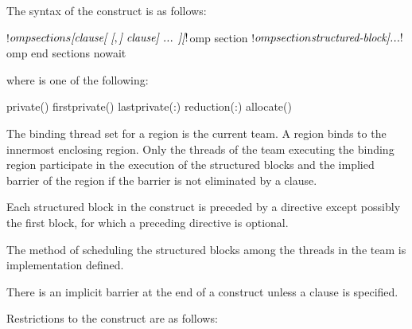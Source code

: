 \begin{fortranspecific}
The syntax of the  construct is as follows:

\begin{ompfPragma}
!$omp sections \plc{[clause[ [},\plc{] clause] ... ]}
   \plc{[}!$omp section\plc{]}
   \plc{[}!$omp section
      \plc{structured-block]}
   \plc{...}
!$omp end sections \plc{[}nowait\plc{]}
\end{ompfPragma}

\begin{samepage}
where  is one of the following:

\begin{indentedcodelist}
private()
firstprivate()
lastprivate(\plc{[ lastprivate-modifier}:\plc{] list})
reduction(:)
allocate(\plc{[allocator: ]})
\end{indentedcodelist}
\end{samepage}
\end{fortranspecific}

\binding
The binding thread set for a  region is the current team. A 
region binds to the innermost enclosing  region. Only the threads of the team
executing the binding  region participate in the execution of the structured
blocks and the implied barrier of the  region if the barrier is not eliminated
by a  clause.

\descr
Each structured block in the  construct is preceded by a  directive
except possibly the first block, for which a preceding  directive is optional.

The method of scheduling the structured blocks among the threads in the team is
implementation defined.

There is an implicit barrier at the end of a  construct unless a 
clause is specified.

{}

\restrictions
Restrictions to the  construct are as follows:

